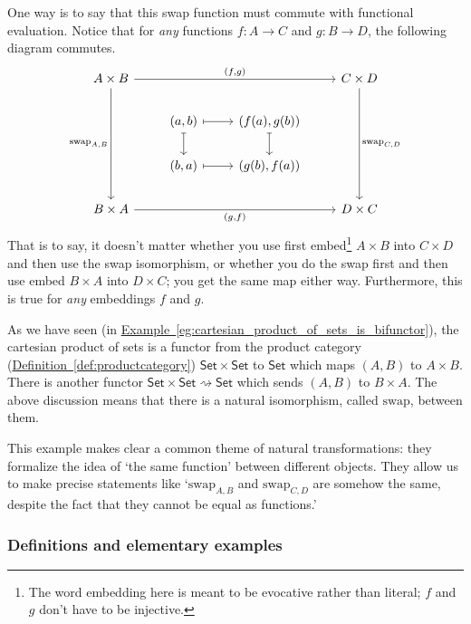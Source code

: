\documentclass[notes.tex]{subfiles}
\begin{document}
One way is to say that this swap function must commute with functional evaluation. Notice that for \emph{any} functions $f\colon A \to C$ and $g\colon B \to D$, the following diagram commutes.
\begin{equation*}
  \begin{tikzcd}
    A \times B
    \arrow[rrr, "{(f, g)}"]
    \arrow[ddd, swap, "{\mathrm{swap}_{A, B}}"]
    &&& C \times D
    \arrow[ddd, "{\mathrm{swap}_{C, D}}"]
    \\
    & (a, b)
    \arrow[r, mapsto]
    \arrow[d, mapsto]
    & (f(a), g(b))
    \arrow[d, mapsto]
    \\
    & (b, a)
    \arrow[r, mapsto]
    & (g(b), f(a))
    \\
    B \times A
    \arrow[rrr, swap, "{(g, f)}"]
    &&& D \times C
  \end{tikzcd}
\end{equation*}
That is to say, it doesn't matter whether you use first embed\footnote{The word embedding here is meant to be evocative rather than literal; $f$ and $g$ don't have to be injective.} $A \times B$ into $C \times D$ and then use the swap isomorphism, or whether you do the swap first and then use embed $B \times A$ into $D \times C$; you get the same map either way. Furthermore, this is true for \emph{any} embeddings $f$ and $g$.

As we have seen (in \hyperref[eg:cartesian_product_of_sets_is_bifunctor]{Example~\ref*{eg:cartesian_product_of_sets_is_bifunctor}}), the cartesian product of sets is a functor from the product category (\hyperref[def:productcategory]{Definition~\ref*{def:productcategory}}) $\mathsf{Set} \times \mathsf{Set}$ to $\mathsf{Set}$ which maps $(A, B)$ to $A \times B$. There is another functor $\mathsf{Set} \times \mathsf{Set} \rightsquigarrow \mathsf{Set}$ which sends $(A, B)$ to $B \times A$. The above discussion means that there is a natural isomorphism, called $\mathrm{swap}$, between them.

This example makes clear a common theme of natural transformations: they formalize the idea of `the same function' between different objects. They allow us to make precise statements like `$\mathrm{swap}_{A, B}$ and $\mathrm{swap}_{C, D}$ are somehow the same, despite the fact that they cannot be equal as functions.'


\subsubsection{Definitions and elementary examples}
\end{document}
